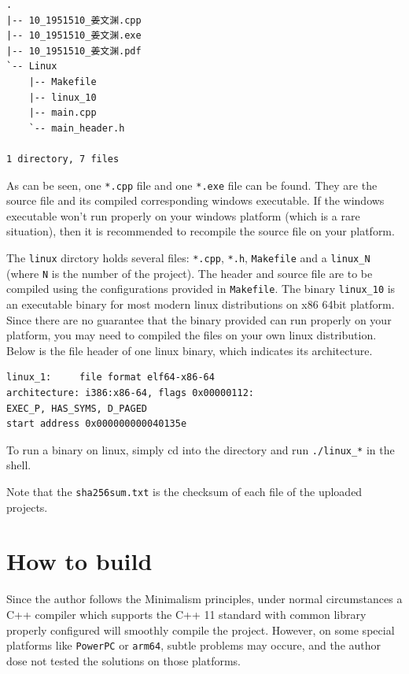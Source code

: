 \documentclass[cn,black,12pt,normal]{elegantnote}
\begin{document}
\begin{lstlisting}
.
|-- 10_1951510_姜文渊.cpp
|-- 10_1951510_姜文渊.exe
|-- 10_1951510_姜文渊.pdf
`-- Linux
    |-- Makefile
    |-- linux_10
    |-- main.cpp
    `-- main_header.h

1 directory, 7 files
\end{lstlisting}

As can be seen, one \lstinline{*.cpp} file and one \lstinline{*.exe} file can be found. They are the source file and its compiled corresponding windows executable. If the windows executable won't run properly on your windows platform (which is a rare situation), then it is recommended to recompile the source file on your platform.

The \lstinline{linux} dirctory holds several files: \lstinline{*.cpp}, \lstinline{*.h}, \lstinline{Makefile} and a \lstinline{linux_N} (where \lstinline{N} is the number of the project). The header and source file are to be compiled using the configurations provided in \lstinline{Makefile}. The binary \lstinline{linux_10} is an executable binary for most modern linux distributions on x86 64bit platform. Since there are no guarantee that the binary provided can run properly on your platform, you may need to compiled the files on your own linux distribution. Below is the file header of one linux binary, which indicates its architecture.

\begin{lstlisting}
linux_1:     file format elf64-x86-64
architecture: i386:x86-64, flags 0x00000112:
EXEC_P, HAS_SYMS, D_PAGED
start address 0x000000000040135e
\end{lstlisting}

To run a binary on linux, simply cd into the directory and run \lstinline{./linux_*} in the shell.

Note that the \lstinline{sha256sum.txt} is the checksum of each file of the uploaded projects.

\section{How to build}

Since the author follows the Minimalism principles, under normal circumstances a C++ compiler which supports the C++ 11 standard with common library properly configured will smoothly compile the project. However, on some special platforms like \lstinline{PowerPC} or \lstinline{arm64}, subtle problems may occure, and the author dose not tested the solutions on those platforms.
\end{document}
